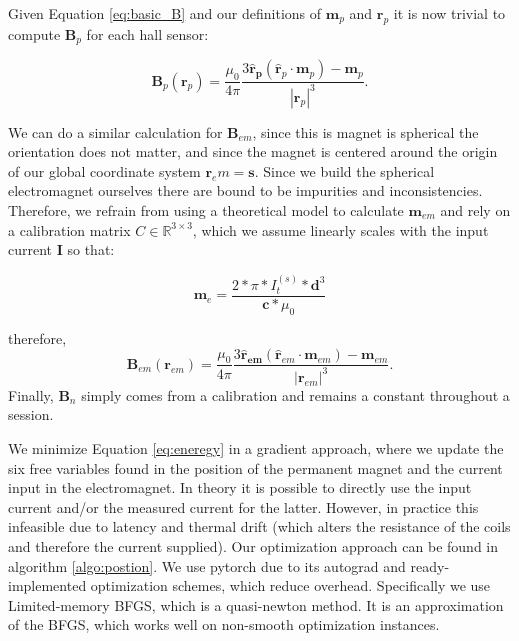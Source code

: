 Given Equation \ref{eq:basic_B} and our definitions of $\mathbf{m}_p$ and $\mathbf{r}_p$ it is now trivial to compute $\mathbf{B}_p$ for each hall sensor:

\begin{equation}
        \mathbf {B}_p (\mathbf {r}_p )={\frac {\mu _{0}}{4\pi }}{\frac {3\mathbf {\hat {r}_p} (\mathbf {\hat {r}}_p \cdot \mathbf {m}_p )-\mathbf {m}_p }{|\mathbf {r}_p |^{3}}}.
        \label{eq:Bp}
\end{equation}

We can do a similar calculation for $\mathbf{B}_{em}$, since this is magnet is spherical the orientation does not matter, and since the magnet is centered around the origin of our global coordinate system $\mathbf{r}_em = \mathbf{s}$. Since we build the spherical electromagnet ourselves there are bound to be impurities and inconsistencies. Therefore, we refrain from using a theoretical model to calculate $\mathbf{m}_{em}$ and rely on a calibration matrix $C \in \mathbb{R}^{3\times3}$, which we assume linearly scales with the input current $\mathbf{I}$ so that:

\begin{equation}\label{eq:me_vs_I}
    \mathbf{m}_e =  \frac{2*\pi*I_t^{(s)}*\mathbf{d}^3}{\mathbf{c} *\mu_0}
\end{equation}

therefore,
\begin{equation}
        \mathbf {B}_{em} (\mathbf {r}_{em} )={\frac {\mu _{0}}{4\pi }}{\frac {3\mathbf {\hat {r}_{em}} (\mathbf {\hat {r}}_{em} \cdot \mathbf {m}_{em} )-\mathbf {m}_{em} }{|\mathbf {r}_{em} |^{3}}}.
        \label{eq:Be}
\end{equation}
Finally, $\mathbf{B}_n$ simply comes from a calibration and remains a constant throughout a session.

We minimize Equation \ref{eq:eneregy} in a gradient approach, where we update the six free variables found in the position of the permanent magnet and the current input in the electromagnet. In theory it is possible to directly use the input current and/or the measured current for the latter. However, in practice this infeasible due to latency and thermal drift (which alters the resistance of the coils and therefore the current supplied). Our optimization approach can be found in algorithm \ref{algo:postion}. We use pytorch due to its autograd and ready-implemented optimization schemes, which reduce overhead. Specifically we use Limited-memory BFGS, which is a quasi-newton method. It is an approximation of the BFGS, which works well on non-smooth optimization instances. 

